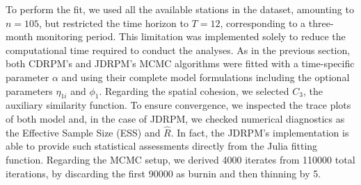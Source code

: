 \documentclass[12pt,	%
	a4paper,		%
	twoside,		%
	openright,		%
	titlepage,%
	]{book}
\theoremstyle{definition}
\begin{document}

To perform the fit, we used all the available stations in the dataset, amounting to $n=105$, but restricted the time horizon to $T=12$, corresponding to a three-month monitoring period. This limitation was implemented solely to reduce the computational time required to conduct the analyses. As in the previous section, both CDRPM's and JDRPM's MCMC algorithms were fitted with a time-specific parameter $\alpha$ and using their complete model formulations including the optional parameters $\eta_{1i}$ and $\phi_1$. Regarding the spatial cohesion, we selected $C_3$, the auxiliary similarity function. To ensure convergence, we inspected the trace plots of both model and, in the case of JDRPM, we checked numerical diagnostics as the Effective Sample Size (ESS) and $\hat R$. In fact, the JDRPM's implementation is able to provide such statistical assessments directly from the Julia fitting function. Regarding the MCMC setup, we derived 4000 iterates from 110000 total iterations, by discarding the first 90000 as burnin and then thinning by 5.
\end{document}
